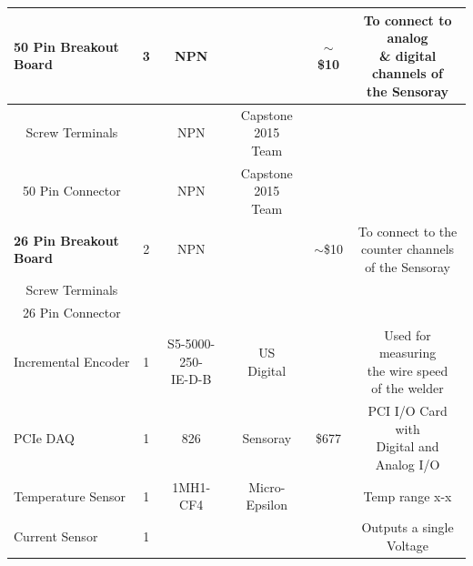 \documentclass[12pt]{article}
\begin{document}
\begin{adjustwidth}{-2cm}{-2cm}
\begin{center}
\begin{tabular}{ |c|c|c|c|c|c| }
  \multicolumn{1}{|l|}{\textbf{50 Pin Breakout Board}} & 3 & NPN & & $\sim$\$10 & \makecell{To connect to analog \\ \& digital channels of \\ the Sensoray} \\ \hline  
  \multicolumn{1}{|c|}{Screw Terminals} & & NPN & \makecell{Capstone 2015 \\ Team} & & \\ \hline  
  \multicolumn{1}{|c|}{50 Pin Connector} & & NPN & \makecell{Capstone 2015 \\ Team} & & \\ \hline  
  
  
  \multicolumn{1}{|l|}{\textbf{26 Pin Breakout Board}} & 2 & NPN & & $\sim$\$10 & \makecell{To connect to the \\ counter channels \\ of the Sensoray} \\ \hline  
  \multicolumn{1}{|c|}{Screw Terminals} & & & & & \\ \hline  
  \multicolumn{1}{|c|}{26 Pin Connector} & & & & & \\ \hline  
  	  
  	  
 \multicolumn{1}{|l|}{Incremental Encoder} & 1 & \makecell{S5-5000-250-\\IE-D-B} & \makecell{US \\ Digital} & & \makecell{Used for measuring \\ the wire speed \\ of the welder}   \\ \hline  

  
  \multicolumn{1}{|l|}{PCIe DAQ} & 1 & 826 & Sensoray & \$677 & \makecell{PCI I/O Card with \\ Digital and Analog I/O}   \\ \hline  
  
  \multicolumn{1}{|l|}{Temperature Sensor} & 1 & 1MH1-CF4 & \makecell{Micro-\\Epsilon} & & Temp range x-x    \\ \hline  
  
  \multicolumn{1}{|l|}{Current Sensor} & 1 & & & &  Outputs a single Voltage  \\ \hline
  
  
  
  
  
\end{tabular}

\end{center}




\clearpage

\end{adjustwidth}
\end{document}
